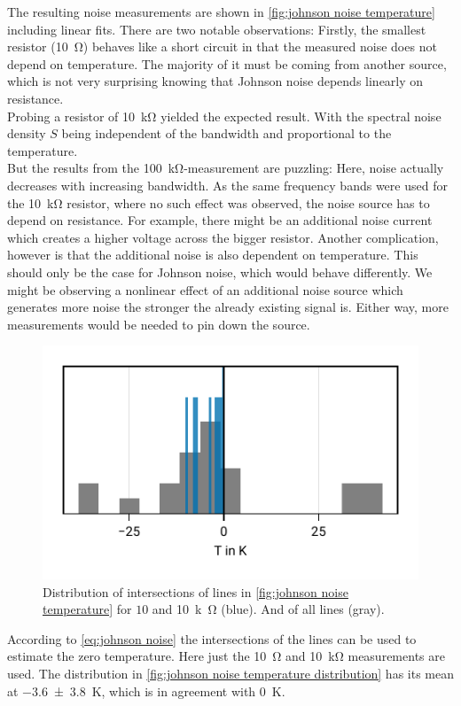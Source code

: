 \documentclass[
    parskip=half, 
    twoside=false,
    twocolumn=true,
    fontsize=11pt,
]{scrarticle}
\begin{document}
The resulting noise measurements are shown in \autoref{fig:johnson noise temperature} including linear fits.
There are two notable observations: 
Firstly, the smallest resistor (\SI{10}{\ohm}) behaves like a short circuit in that the measured noise does not depend on temperature. 
The majority of it must be coming from another source, which is not very surprising knowing that Johnson noise depends linearly on resistance.\\
Probing a resistor of \SI{10}{\kilo\ohm} yielded the expected result. 
With the spectral noise density $S$ being independent of the bandwidth and proportional to the temperature.\\
But the results from the \SI{100}{\kilo\ohm}-measurement are puzzling: Here, noise actually decreases with increasing bandwidth.
As the same frequency bands were used for the \SI{10}{\kilo\ohm} resistor, where no such effect was observed, the noise source has to depend on resistance. 
For example, there might be an additional noise current which creates a higher voltage across the bigger resistor.
Another complication, however is that the additional noise is also dependent on temperature. 
This should only be the case for Johnson noise, which would behave differently. 
We might be observing a nonlinear effect of an additional noise source which generates more noise the stronger the already existing signal is.
Either way, more measurements would be needed to pin down the source.

\begin{figure}[h!]
    \centering
    \includegraphics{figures/02 temperature distribution.pdf}
    \caption{
        Distribution of intersections of lines in \autoref{fig:johnson noise temperature} for $10$ and \SI{10}{k\ohm} (blue).
        And of all lines (gray).
    }
    \label{fig:johnson noise temperature distribution}
\end{figure}
According to \autoref{eq:johnson noise} the intersections of the lines can be used to estimate the zero temperature.
Here just the \SI{10}{\ohm} and \SI{10}{\kilo\ohm} measurements are used.
The distribution in \autoref{fig:johnson noise temperature distribution} has its mean at \SI{-3.6(38)}{K}, which is in agreement with \SI{0}{K}.
\end{document}
